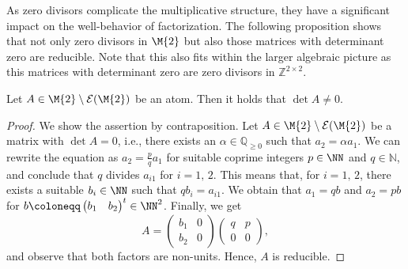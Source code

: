 As zero divisors complicate the multiplicative structure, they have a significant impact on the well-behavior of factorization. The following proposition shows that not only zero divisors in $\M{2}$ but also those matrices with determinant zero are reducible. Note that this also fits within the larger algebraic picture as this matrices with determinant zero are zero divisors in $\mathbb{Z}^{2 \times 2}$.

\begin{proposition}\label{prop:determinant-of-2x2-atoms}
Let $A \in \M{2}\setminus\mathcal{E}(\M{2})$ be an atom. Then it holds that $\det{A} \neq 0$.
\end{proposition}

\begin{proof}
We show the assertion by contraposition. Let $A \in \M{2}\setminus\mathcal{E}(\M{2})$ be a matrix with $\det{A} = 0$, i.e., there exists an $\alpha \in \mathbb{Q}_{\geq 0}$ such that $a_2 = \alpha a_1$. We can rewrite the equation as $a_2 = \frac{p}{q} a_1$ for suitable coprime integers $p \in \NN$ and $q \in \mathbb{N}$, and conclude that $q$ divides $a_{i1}$ for $i = 1, \,2$. This means that, for $i=1, \,2$, there exists a suitable $b_{i} \in \NN$ such that $q b_i = a_{i1}$. We obtain that $a_1 = qb$ and $a_2 = p b$ for $b \coloneqq \begin{pmatrix} b_1 & b_2\end{pmatrix}^t \in \NN^2$. Finally, we get 
\[ A =\begin{pmatrix} b_1 & 0 \\ b_2 & 0 \end{pmatrix} \begin{pmatrix} q & p \\ 0 & 0 \end{pmatrix}, \]
and observe that both factors are non-units. Hence, $A$ is reducible.
\end{proof}

